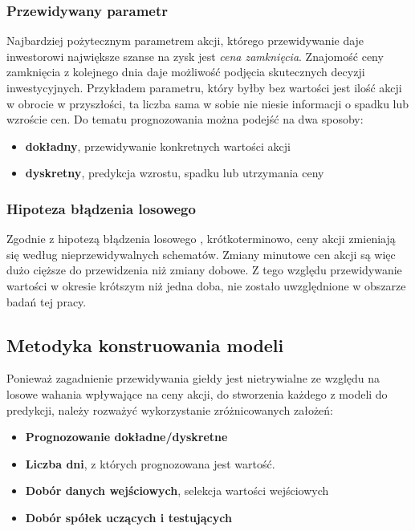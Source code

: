 \documentclass[a4paper, twoside, 11pt, openright]{article}
\begin{document}
\subsubsection{Przewidywany parametr}

Najbardziej pożytecznym parametrem akcji, którego przewidywanie daje inwestorowi największe szanse na zysk jest \textit{cena zamknięcia}. Znajomość ceny zamknięcia z kolejnego dnia daje możliwość podjęcia skutecznych decyzji inwestycyjnych. Przykładem parametru, który byłby bez wartości jest ilość akcji w obrocie w przyszłości, ta liczba sama w sobie nie niesie informacji o spadku lub wzroście cen. Do tematu prognozowania można podejść na dwa sposoby:
\begin{itemize}
\item{\textbf{dokładny}, przewidywanie konkretnych wartości akcji}
\item{\textbf{dyskretny}, predykcja wzrostu, spadku lub utrzymania ceny}
\end{itemize}

\subsubsection{Hipoteza błądzenia losowego}

Zgodnie z hipotezą błądzenia losowego \cite{randwalk}, krótkoterminowo, ceny akcji zmieniają się według nieprzewidywalnych schematów. Zmiany minutowe cen akcji są więc dużo cięższe do przewidzenia niż zmiany dobowe. Z tego względu przewidywanie wartości w okresie krótszym niż jedna doba, nie zostało uwzględnione w obszarze badań tej pracy.

\subsection{Metodyka konstruowania modeli}

Ponieważ zagadnienie przewidywania giełdy jest nietrywialne ze względu na losowe wahania wpływające na ceny akcji, do stworzenia każdego z modeli do predykcji, należy rozważyć wykorzystanie zróżnicowanych założeń:
	
\begin{itemize}
\item{\textbf{Prognozowanie dokładne/dyskretne} }
\item{\textbf{Liczba dni}, z których prognozowana jest wartość.}
\item{\textbf{Dobór danych wejściowych}, selekcja wartości wejściowych}
\item{\textbf{Dobór spółek uczących i testujących}}
\end{itemize}
\end{document}
